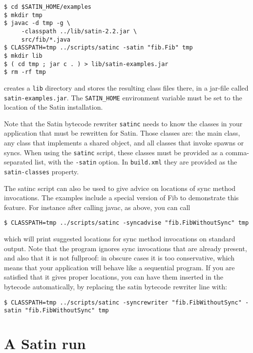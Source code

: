 \documentclass[a4paper,10pt]{article}
\begin{document}
\begin{verbatim}
$ cd $SATIN_HOME/examples
$ mkdir tmp
$ javac -d tmp -g \
     -classpath ../lib/satin-2.2.jar \
     src/fib/*.java
$ CLASSPATH=tmp ../scripts/satinc -satin "fib.Fib" tmp
$ mkdir lib
$ ( cd tmp ; jar c . ) > lib/satin-examples.jar
$ rm -rf tmp
\end{verbatim}

creates a \texttt{lib} directory and stores the resulting class files there,
in a jar-file called \texttt{satin-examples.jar}.
The \texttt{SATIN\_HOME} environment variable must be set to the location of
the Satin installation.

Note that the Satin bytecode rewriter \texttt{satinc} needs to know the
classes in your application that must be rewritten for Satin.
Those classes are: the main class, any class that implements a shared object,
and all classes that invoke spawns or syncs.
When using the \texttt{satinc} script, these classes must be provided as
a comma-separated list, with the \texttt{-satin} option. In
\texttt{build.xml} they are provided as the \texttt{satin-classes} property.

The satinc script can also be used to give advice on locations of sync method
invocations. The examples include a special version of Fib to demonstrate this
feature. For instance after calling javac, as above, you can call

\begin{verbatim}
$ CLASSPATH=tmp ../scripts/satinc -syncadvise "fib.FibWithoutSync" tmp
\end{verbatim}

which will print suggested locations for sync method invocations on standard
output. Note that the program ignores sync invocations that are already present,
and also that it is not fullproof: in obscure cases it is too conservative,
which means that your application will behave like a sequential program.
If you are satisfied that it gives proper
locations, you can have them inserted in the bytecode automatically, by replacing
the satin bytecode rewriter line with:

\begin{verbatim}
$ CLASSPATH=tmp ../scripts/satinc -syncrewriter "fib.FibWithoutSync" -satin "fib.FibWithoutSync" tmp
\end{verbatim}

\section{A Satin run}
\end{document}
